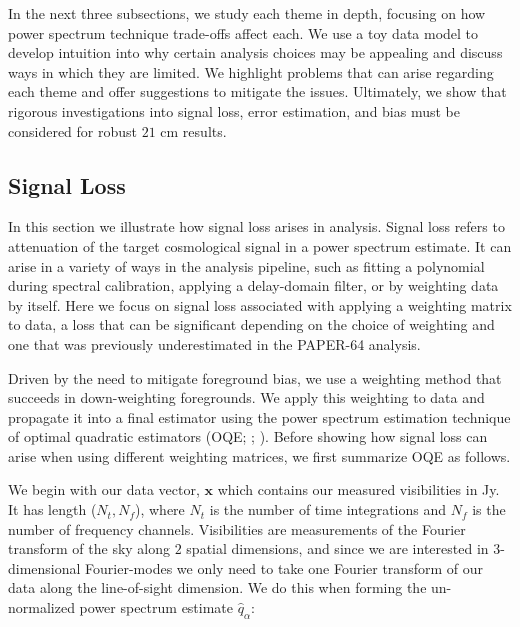 \documentclass[preprint2,numberedappendix,tighten]{aastex6}  %
\begin{document}
In the next three subsections, we study each theme in depth, focusing on how power spectrum technique trade-offs affect each. We use a toy data model to develop intuition into why certain analysis choices may be appealing and discuss ways in which they are limited. We highlight problems that can arise regarding each theme and offer suggestions to mitigate the issues. Ultimately, we show that rigorous investigations into signal loss, error estimation, and bias must be considered for robust $21$ cm results.


\subsection{Signal Loss}
\label{sec:SiglossOverview}

In this section we illustrate how signal loss arises in analysis. Signal loss refers to attenuation of the target cosmological signal in a power spectrum estimate. It can arise in a variety of ways in the analysis pipeline, such as fitting a polynomial during spectral calibration, applying a delay-domain filter, or by weighting data by itself. Here we focus on signal loss associated with applying a weighting matrix to data, a loss that can be significant depending on the choice of weighting and one that was previously underestimated in the PAPER-64 analysis.

Driven by the need to mitigate foreground bias, we use a weighting method that succeeds in down-weighting foregrounds. We apply this weighting to data and propagate it into a final estimator using the power spectrum estimation technique of optimal quadratic estimators (OQE; \citealt{liu_tegmark2011}; \citealt{liu_et_al2014b}). Before showing how signal loss can arise when using different weighting matrices, we first summarize OQE as follows.

We begin with our data vector, $\textbf{x}$ which contains our measured visibilities in Jy. It has length ($N_{t}, N_{f}$), where $N_{t}$ is the number of time integrations and $N_{f}$ is the number of frequency channels. Visibilities are measurements of the Fourier transform of the sky along $2$ spatial dimensions, and since we are interested in $3$-dimensional Fourier-modes we only need to take one Fourier transform of our data along the line-of-sight dimension. We do this when forming the un-normalized power spectrum estimate $\hat{q}_{\alpha}$:
\end{document}
